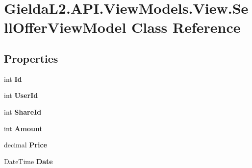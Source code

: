 \hypertarget{class_gielda_l2_1_1_a_p_i_1_1_view_models_1_1_view_1_1_sell_offer_view_model}{}\section{Gielda\+L2.\+A\+P\+I.\+View\+Models.\+View.\+Sell\+Offer\+View\+Model Class Reference}
\label{class_gielda_l2_1_1_a_p_i_1_1_view_models_1_1_view_1_1_sell_offer_view_model}
\subsection*{Properties}
\begin{DoxyCompactItemize}
\item 
\mbox{\label{class_gielda_l2_1_1_a_p_i_1_1_view_models_1_1_view_1_1_sell_offer_view_model_a5be6dcba895b64e04049b593aa351c0f}} 
int {\bfseries Id}
\item 
\mbox{\label{class_gielda_l2_1_1_a_p_i_1_1_view_models_1_1_view_1_1_sell_offer_view_model_a5e790453506d3ae1b002bcfd60fbaf5d}} 
int {\bfseries User\+Id}
\item 
\mbox{\label{class_gielda_l2_1_1_a_p_i_1_1_view_models_1_1_view_1_1_sell_offer_view_model_ac88c2c4dd88698cf36eb6560bd392159}} 
int {\bfseries Share\+Id}
\item 
\mbox{\label{class_gielda_l2_1_1_a_p_i_1_1_view_models_1_1_view_1_1_sell_offer_view_model_a8588eac182168eb14e69a4693fc0948e}} 
int {\bfseries Amount}
\item 
\mbox{\label{class_gielda_l2_1_1_a_p_i_1_1_view_models_1_1_view_1_1_sell_offer_view_model_a7db7bdc1dec548ad7f829d69fd36c1f6}} 
decimal {\bfseries Price}
\item 
\mbox{\label{class_gielda_l2_1_1_a_p_i_1_1_view_models_1_1_view_1_1_sell_offer_view_model_abe0290ef46acd02599d5feff5b0d33e2}} 
Date\+Time {\bfseries Date}
\end{DoxyCompactItemize}


